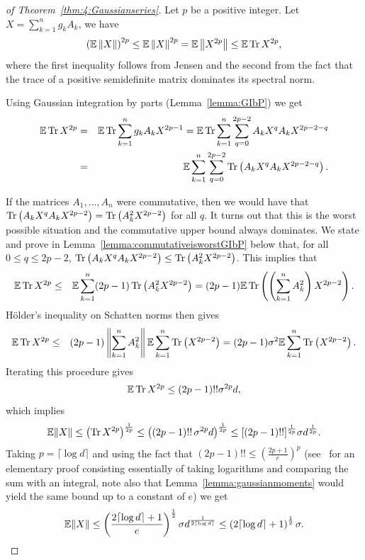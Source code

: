 \begin{proof}[of Theorem~\ref{thm:4:Gaussianseries}]

Let $p$ be a positive integer. Let $X =  \sum_{k=1}^{n} g_k A_k$, we have
\[
\left(\mathbb{E}\left\| X\right\|\right)^{2p} \leq \mathbb{E}\left\| X \right\|^{2p} =  \mathbb{E}\left\| X^{2p} \right\| \leq \mathbb{E} \operatorname{Tr} X^{2p} ,
\]
where the first inequality follows from Jensen and the second from the fact that the trace of a positive semidefinite matrix dominates its spectral norm.

Using Gaussian integration by parts (Lemma~\ref{lemma:GIbP}) we get
\begin{eqnarray*}
\mathbb{E} \operatorname{Tr} X^{2p} &=& \mathbb{E} \operatorname{Tr}\sum_{k=1}^ng_kA_k X^{2p-1} =  \mathbb{E} \operatorname{Tr}\sum_{k=1}^n\sum_{q=0}^{2p-2}A_kX^qA_kX^{2p-2-q} \\ 
&=&  \mathbb{E}\sum_{k=1}^n\sum_{q=0}^{2p-2} \operatorname{Tr}\left(A_kX^qA_kX^{2p-2-q}\right).
\end{eqnarray*}

If the matrices $A_1,\dots,A_n$ were commutative, then we would have that $\operatorname{Tr}\left(A_kX^qA_kX^{2p-2}\right) = \operatorname{Tr}\left(A_k^2X^{2p-2}\right)$ for all $q$. It turns out that this is the worst possible situation and the commutative upper bound always dominates. We state and prove in Lemma~\ref{lemma:commutativeisworstGIbP} below that, for all $0\leq q\leq 2p-2$, $\operatorname{Tr}\left(A_kX^qA_kX^{2p-2}\right) \leq \operatorname{Tr}\left(A_k^2X^{2p-2}\right)$. This implies that
\begin{eqnarray*}
\mathbb{E} \operatorname{Tr} X^{2p} &\leq & \mathbb{E}\sum_{k=1}^n(2p-1) \operatorname{Tr}\left(A_k^2X^{2p-2}\right) = (2p-1) \mathbb{E}\operatorname{Tr}\left(\left(\sum_{k=1}^nA_k^2\right)X^{2p-2}\right).
\end{eqnarray*}
H\"older's inequality on Schatten norms then gives
\begin{eqnarray*}
\mathbb{E} \operatorname{Tr} X^{2p} &\leq & (2p-1) \left\| \sum_{k=1}^nA_k^2 \right\| \mathbb{E}\sum_{k=1}^n \operatorname{Tr}\left(X^{2p-2}\right) = (2p-1)\sigma^2 \mathbb{E}\sum_{k=1}^n \operatorname{Tr}\left(X^{2p-2}\right).
\end{eqnarray*}
Iterating this procedure gives
\begin{equation*}
\mathbb{E} \operatorname{Tr} X^{2p} \leq (2p-1)!! \sigma^{2p} d,
\end{equation*}
which implies
\begin{equation}
\mathbb{E}\|X\| \leq \left( \operatorname{Tr} X^{2p} \right)^{\frac1{2p}} \leq  \left( (2p-1)!!\, \sigma^{2p} d \right)^{\frac1{2p}} \leq [(2p-1)!!]^{\frac1{2p}} \sigma d^{\frac1{2p}}.
\end{equation}
Taking $p = \lceil \log d \rceil$ and using the fact that $(2p-1)!! \leq \left( \frac{2p+1}{e} \right)^p$ (see~\cite{Tropp_MatrixConcentrationElementary} for an elementary proof consisting essentially of taking logarithms and comparing the sum with an integral, note also that Lemma~\ref{lemma:gaussianmoments} would yield the same bound up to a constant of $e$) we get
\[
\mathbb{E} \|X\| \leq \left( \frac{2\lceil \log d \rceil+1}{e} \right)^{\frac12} \sigma d^{\frac1{2 \lceil \log d \rceil }} \leq \left( 2\lceil \log d \rceil+1 \right)^{\frac12} \sigma.
\]
\end{proof}


